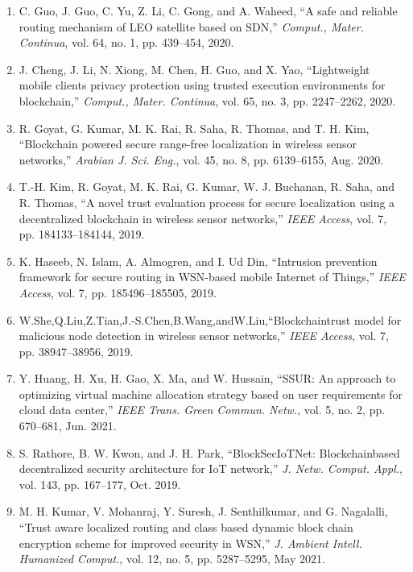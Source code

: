 \documentclass{article} %
\begin{document}
\begin{enumerate}
\item  C. Guo, J. Guo, C. Yu, Z. Li, C. Gong, and A. Waheed, ``A safe and reliable routing mechanism of LEO satellite based on SDN,'' \textit{Comput., Mater. Continua}, vol. 64, no. 1, pp. 439--454, 2020.

\item  J. Cheng, J. Li, N. Xiong, M. Chen, H. Guo, and X. Yao, ``Lightweight mobile clients privacy protection using trusted execution environments for blockchain,'' \textit{Comput., Mater. Continua}, vol. 65, no. 3, pp. 2247--2262, 2020.

\item  R. Goyat, G. Kumar, M. K. Rai, R. Saha, R. Thomas, and T. H. Kim, ``Blockchain powered secure range-free localization in wireless sensor networks,'' \textit{Arabian J. Sci. Eng.}, vol. 45, no. 8, pp. 6139--6155, Aug. 2020.

\item  T.-H. Kim, R. Goyat, M. K. Rai, G. Kumar, W. J. Buchanan, R. Saha, and R. Thomas, ``A novel trust evaluation process for secure localization using a decentralized blockchain in wireless sensor networks,'' \textit{IEEE Access}, vol. 7, pp. 184133--184144, 2019.

\item  K. Haseeb, N. Islam, A. Almogren, and I. Ud Din, ``Intrusion prevention framework for secure routing in WSN-based mobile Internet of Things,'' \textit{IEEE Access}, vol. 7, pp. 185496--185505, 2019.

\item  W.She,Q.Liu,Z.Tian,J.-S.Chen,B.Wang,andW.Liu,``Blockchaintrust model for malicious node detection in wireless sensor networks,'' \textit{IEEE Access}, vol. 7, pp. 38947--38956, 2019.

\item  Y. Huang, H. Xu, H. Gao, X. Ma, and W. Hussain, ``SSUR: An approach to optimizing virtual machine allocation strategy based on user requirements for cloud data center,'' \textit{IEEE Trans. Green Commun. Netw.}, vol. 5, no. 2, pp. 670--681, Jun. 2021.

\item  S. Rathore, B. W. Kwon, and J. H. Park, ``BlockSecIoTNet: Blockchainbased decentralized security architecture for IoT network,'' \textit{J. Netw. Comput. Appl.}, vol. 143, pp. 167--177, Oct. 2019.

\item  M. H. Kumar, V. Mohanraj, Y. Suresh, J. Senthilkumar, and G. Nagalalli, ``Trust aware localized routing and class based dynamic block chain encryption scheme for improved security in WSN,'' \textit{J. Ambient Intell. Humanized Comput.}, vol. 12, no. 5, pp. 5287--5295, May 2021.


\end{enumerate}
\end{document}
